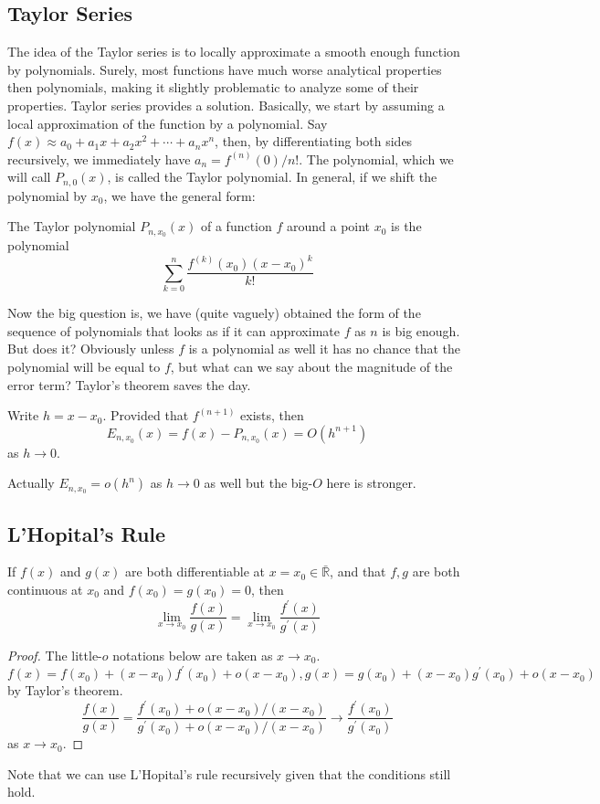 \subsection{Taylor Series}
The idea of the Taylor series is to locally approximate a smooth enough function by polynomials.
Surely, most functions have much worse analytical properties then polynomials, making it slightly problematic to analyze some of their properties.
Taylor series provides a solution.
Basically, we start by assuming a local approximation of the function by a polynomial.
Say $f(x)\approx a_0+a_1x+a_2x^2+\cdots+a_nx^n$, then, by differentiating both sides recursively, we immediately have $a_n=f^{(n)}(0)/n!$.
The polynomial, which we will call $P_{n,0}(x)$, is called the Taylor polynomial.
In general, if we shift the polynomial by $x_0$, we have the general form:
\begin{definition}
    The Taylor polynomial $P_{n,x_0}(x)$ of a function $f$ around a point $x_0$ is the polynomial
    $$\sum_{k=0}^{n}\frac{f^{(k)}(x_0)(x-x_0)^k}{k!}$$
\end{definition}
Now the big question is, we have (quite vaguely) obtained the form of the sequence of polynomials that looks as if it can approximate $f$ as $n$ is big enough.
But does it?
Obviously unless $f$ is a polynomial as well it has no chance that the polynomial will be equal to $f$, but what can we say about the magnitude of the error term?
Taylor's theorem saves the day.
\begin{theorem}
    Write $h=x-x_0$.
	Provided that $f^{(n+1)}$ exists, then
    $$E_{n,x_0}(x)=f(x)-P_{n,x_0}(x)=O(h^{n+1})$$
    as $h\to 0$.
\end{theorem}
Actually $E_{n,x_0}=o(h^n)$ as $h\to 0$ as well but the big-$O$ here is stronger.
\subsection{L'Hopital's Rule}
\begin{theorem}
    If $f(x)$ and $g(x)$ are both differentiable at $x=x_0\in\bar{\mathbb R}$, and that $f,g$ are both continuous at $x_0$ and $f(x_0)=g(x_0)=0$, then
    $$\lim_{x\to x_0}\frac{f(x)}{g(x)}=\lim_{x\to x_0}\frac{f^\prime(x)}{g^\prime(x)}$$
\end{theorem}
\begin{proof}
    The little-$o$ notations below are taken as $x\to x_0$.
    $$f(x)=f(x_0)+(x-x_0)f^\prime(x_0)+o(x-x_0), g(x)=g(x_0)+(x-x_0)g^\prime(x_0)+o(x-x_0)$$
    by Taylor's theorem.
    $$\frac{f(x)}{g(x)}=\frac{f^\prime(x_0)+o(x-x_0)/(x-x_0)}{g^\prime(x_0)+o(x-x_0)/(x-x_0)}\to \frac{f^\prime(x_0)}{g^\prime(x_0)}$$
    as $x\to x_0$.
\end{proof}
Note that we can use L'Hopital's rule recursively given that the conditions still hold.
